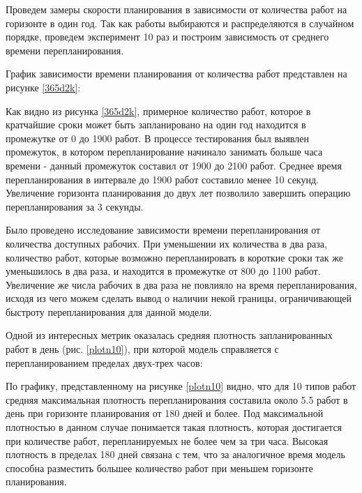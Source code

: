 Проведем замеры скорости планирования в зависимости от количества работ на горизонте в один год. Так как работы выбираются и распределяются в случайном порядке, проведем эксперимент 10 раз и построим зависимость от среднего времени перепланирования.

График зависимости времени планирования от количества работ представлен на рисунке \ref{365d2k}:


Как видно из рисунка \ref{365d2k}, примерное количество работ, которое в кратчайшие сроки может быть запланировано на один год находится в промежутке от 0 до 1900 работ. В процессе тестирования был выявлен промежуток, в котором перепланирование начинало занимать больше часа времени - данный промежуток составил от 1900 до 2100 работ. Среднее время перепланирования в интервале до 1900 работ составило менее 10 секунд. Увеличение горизонта планирования до двух лет позволило завершить операцию перепланирования за 3 секунды.

Было проведено исследование зависимости времени перепланирования от количества доступных рабочих. При уменьшении их количества в два раза, количество работ, которые возможно перепланировать в короткие сроки так же уменьшилось в два раза, и находится в промежутке от 800 до 1100 работ. Увеличение же числа рабочих в два раза не повлияло на время перепланирования, исходя из чего можем сделать вывод о наличии некой границы, ограничивающей быстроту перепланирования для данной модели.

Одной из интересных метрик оказалась средняя плотность запланированных работ в день (рис. \ref{plotn10}), при которой модель справляется с перепланированием пределах двух-трех часов:


По графику, представленному на рисунке \ref{plotn10} видно, что для 10 типов работ средняя максимальная плотность перепланирования составила около 5.5 работ в день при горизонте планирования от 180 дней и более. Под максимальной плотностью в данном случае понимается такая плотность, которая достигается при количестве работ, перепланируемых не более чем за три часа. Высокая плотность в пределах 180 дней связана с тем, что за аналогичное время модель способна разместить большее количество работ при меньшем горизонте планирования.

